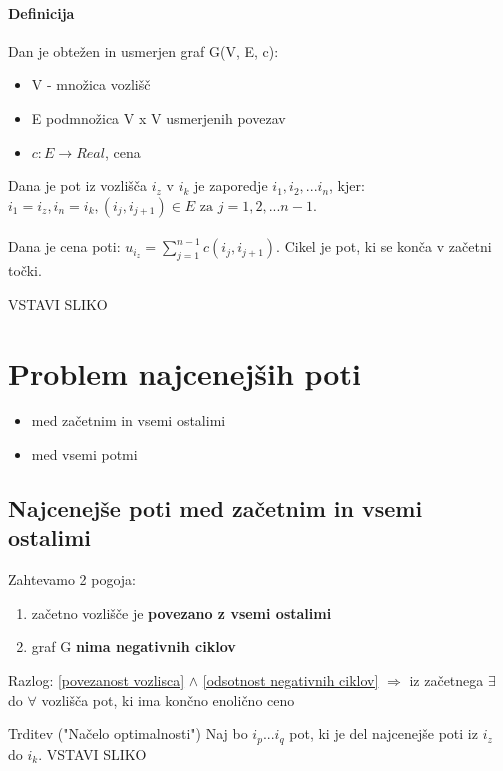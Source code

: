 \documentclass[a4paper,10pt]{article}
\begin{document}
\paragraph{Definicija}
Dan je obte\v zen in usmerjen graf G(V, E, c):
\begin{itemize}
\item V - mno\v zica vozli\v s\v c
\item E podmno\v zica V x V usmerjenih povezav
\item $c: E \rightarrow Real$, cena
\end{itemize}
Dana je pot iz vozli\v s\v ca $i_z$ v $i_k$ je zaporedje $i_1, i_2,... i_n$, kjer: $i_1=i_z, i_n=i_k, (i_j, i_{j+1}) \in E \mbox{ za } j=1,2,...n-1$.\\
\\
Dana je cena poti: $u_{i_{z}} = \sum_{j=1}^{n-1}c(i_j, i_{j+1})$. Cikel je pot, ki se kon\v ca v za\v cetni to\v cki.

VSTAVI SLIKO





\section{Problem najcenej\v sih poti}
\begin{itemize}
\item med za\v cetnim in vsemi ostalimi
\item med vsemi potmi
\end{itemize}

\subsection{Najcenej\v se poti med za\v cetnim in vsemi ostalimi}
Zahtevamo 2 pogoja:
\begin{enumerate}
\item za\v cetno vozli\v s\v ce je \textbf{povezano z vsemi ostalimi} \label{povezanost vozlisca}
\item graf G \textbf{nima negativnih ciklov} \label{odsotnost negativnih ciklov}
\end{enumerate}

Razlog: \ref{povezanost vozlisca} $\wedge$ \ref{odsotnost negativnih ciklov} $\Rightarrow$ iz za\v cetnega $\exists$ do $\forall$ vozli\v s\v ca pot, ki ima kon\v cno enoli\v cno ceno

Trditev ("Na\v celo optimalnosti")
Naj bo $i_p...i_q$ pot, ki je del najcenej\v se poti iz $i_z$ do $i_k$.
VSTAVI SLIKO
\end{document}
